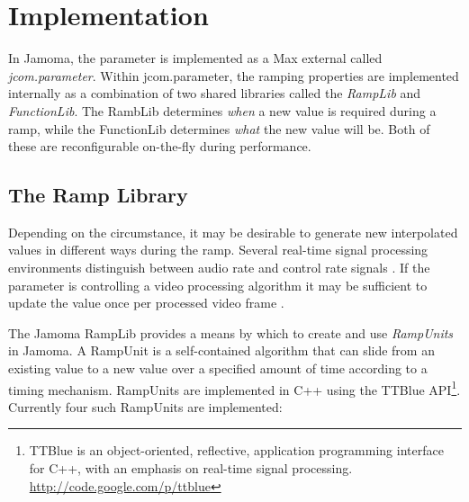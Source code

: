 \documentclass{article}
\begin{document}

\section{Implementation} %
\label{sec:param_implementation}

In Jamoma, the parameter is implemented as a Max external called \emph{jcom.parameter}. Within jcom.parameter, the ramping properties are implemented internally as a combination of two shared libraries called the \emph{RampLib} and \emph{FunctionLib}. The RambLib determines \emph{when} a new value is required during a ramp, while the FunctionLib determines \emph{what} the new value will be. Both of these are reconfigurable on-the-fly during performance.

\subsection{The Ramp Library} %
\label{ssec:ramplib}

Depending on the circumstance, it may be desirable to generate new interpolated values in different ways during the ramp. Several real-time signal processing environments distinguish between audio rate and control rate signals \cite{Boulanger:2000csound, McCartney:1996supercollider}. If the parameter is controlling a video processing algorithm it may be sufficient to update the value once per processed video frame \cite{Jones:2005jitter}.

The Jamoma RampLib provides a means by which to create and use \emph{RampUnits} in Jamoma.  A RampUnit is a self-contained algorithm that can slide from an existing value to a new value over a specified amount of time according to a timing mechanism. RampUnits are implemented in C++ using the TTBlue API\footnote{TTBlue is an object-oriented, reflective, application programming interface for C++, with an emphasis on real-time signal processing. \url{http://code.google.com/p/ttblue}}. Currently four such RampUnits are implemented:
\end{document}
